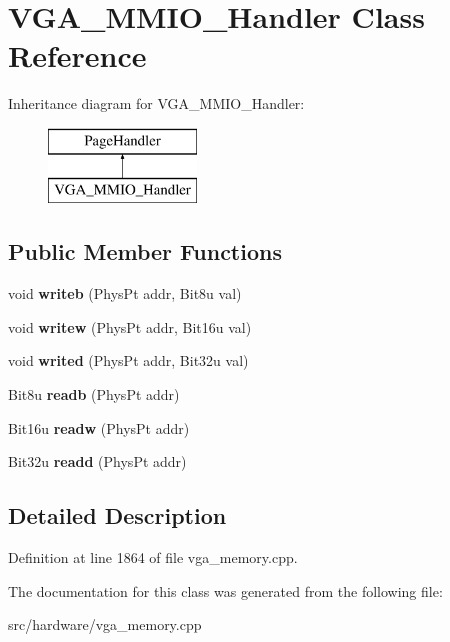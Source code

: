 \hypertarget{classVGA__MMIO__Handler}{\section{V\-G\-A\-\_\-\-M\-M\-I\-O\-\_\-\-Handler Class Reference}
\label{classVGA__MMIO__Handler}
}
Inheritance diagram for V\-G\-A\-\_\-\-M\-M\-I\-O\-\_\-\-Handler\-:\begin{figure}[H]
\begin{center}
\leavevmode
\includegraphics[height=2.000000cm]{classVGA__MMIO__Handler}
\end{center}
\end{figure}
\subsection*{Public Member Functions}
\begin{DoxyCompactItemize}
\item 
\hypertarget{classVGA__MMIO__Handler_ad50b71d3404bc469af03ff56d745e3a8}{void {\bfseries writeb} (Phys\-Pt addr, Bit8u val)}\label{classVGA__MMIO__Handler_ad50b71d3404bc469af03ff56d745e3a8}

\item 
\hypertarget{classVGA__MMIO__Handler_aa3e3785653f2764c24b7a815c0d2bd7d}{void {\bfseries writew} (Phys\-Pt addr, Bit16u val)}\label{classVGA__MMIO__Handler_aa3e3785653f2764c24b7a815c0d2bd7d}

\item 
\hypertarget{classVGA__MMIO__Handler_ac4bf7b683128264f52162cd970422707}{void {\bfseries writed} (Phys\-Pt addr, Bit32u val)}\label{classVGA__MMIO__Handler_ac4bf7b683128264f52162cd970422707}

\item 
\hypertarget{classVGA__MMIO__Handler_a84f44545ceb3036c10c93774b96364d7}{Bit8u {\bfseries readb} (Phys\-Pt addr)}\label{classVGA__MMIO__Handler_a84f44545ceb3036c10c93774b96364d7}

\item 
\hypertarget{classVGA__MMIO__Handler_a6946b527e6a8a6bb0971c7c8ea6f0cb4}{Bit16u {\bfseries readw} (Phys\-Pt addr)}\label{classVGA__MMIO__Handler_a6946b527e6a8a6bb0971c7c8ea6f0cb4}

\item 
\hypertarget{classVGA__MMIO__Handler_a8bc6f029559b7684a76741335d10d1f6}{Bit32u {\bfseries readd} (Phys\-Pt addr)}\label{classVGA__MMIO__Handler_a8bc6f029559b7684a76741335d10d1f6}

\end{DoxyCompactItemize}


\subsection{Detailed Description}


Definition at line 1864 of file vga\-\_\-memory.\-cpp.



The documentation for this class was generated from the following file\-:\begin{DoxyCompactItemize}
\item 
src/hardware/vga\-\_\-memory.\-cpp\end{DoxyCompactItemize}
